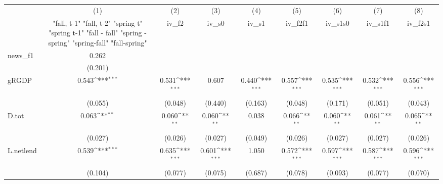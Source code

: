 {
\def\sym#1{\ifmmode^{#1}\else\(^{#1}\)\fi}
\begin{tabular}{l*{8}{c}}
\toprule
            &\multicolumn{1}{c}{(1)}&\multicolumn{1}{c}{(2)}&\multicolumn{1}{c}{(3)}&\multicolumn{1}{c}{(4)}&\multicolumn{1}{c}{(5)}&\multicolumn{1}{c}{(6)}&\multicolumn{1}{c}{(7)}&\multicolumn{1}{c}{(8)}\\
            &\multicolumn{1}{c}{  "fall, t-1" "fall, t-2" "spring t" "spring t-1"  "fall - fall" "spring - spring" "spring-fall" "fall-spring" }&\multicolumn{1}{c}{iv\_f2}&\multicolumn{1}{c}{iv\_s0}&\multicolumn{1}{c}{iv\_s1}&\multicolumn{1}{c}{iv\_f2f1}&\multicolumn{1}{c}{iv\_s1s0}&\multicolumn{1}{c}{iv\_s1f1}&\multicolumn{1}{c}{iv\_f2s1}\\
\midrule
news\_f1     &       0.262         &                     &                     &                     &                     &                     &                     &                     \\
            &     (0.201)         &                     &                     &                     &                     &                     &                     &                     \\
\addlinespace
gRGDP       &       0.543\sym{***}&       0.531\sym{***}&       0.607         &       0.440\sym{***}&       0.557\sym{***}&       0.535\sym{***}&       0.532\sym{***}&       0.556\sym{***}\\
            &     (0.055)         &     (0.048)         &     (0.440)         &     (0.163)         &     (0.048)         &     (0.171)         &     (0.051)         &     (0.043)         \\
\addlinespace
D.tot       &       0.063\sym{**} &       0.060\sym{**} &       0.060\sym{**} &       0.038         &       0.066\sym{**} &       0.060\sym{**} &       0.061\sym{**} &       0.065\sym{**} \\
            &     (0.027)         &     (0.026)         &     (0.027)         &     (0.049)         &     (0.026)         &     (0.027)         &     (0.027)         &     (0.026)         \\
\addlinespace
L.netlend   &       0.539\sym{***}&       0.635\sym{***}&       0.601\sym{***}&       1.050         &       0.572\sym{***}&       0.597\sym{***}&       0.587\sym{***}&       0.596\sym{***}\\
            &     (0.104)         &     (0.077)         &     (0.075)         &     (0.687)         &     (0.078)         &     (0.093)         &     (0.077)         &     (0.070)         \\

\end{tabular}}
